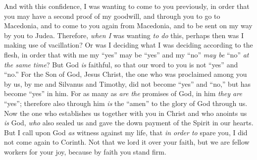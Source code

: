 \begin{biblechapter}
 And with this confidence, I was wanting to come to you previously, in order that you may have a second proof of my goodwill,
\verse and through you to go to Macedonia, and to come to you again from Macedonia, and to be sent on my way by you to Judea.
\verse Therefore, \textit{when I} was wanting \textit{to do} this, perhaps then was I making use of vacillation? Or was I deciding what I was deciding according to the flesh, in order that with me my “yes” may be “yes” and my “no” \textit{may be} “no” \textit{at the same time}?
\verse But God \textit{is} faithful, so that our word to you is not “yes” and “no.”
\verse For the Son of God, Jesus Christ, the one who was proclaimed among you by us, by me and Silvanus and Timothy, did not become “yes” and “no,” but has become “yes” in him.
\verse For as many as \textit{are the} promises of God, in him \textit{they are} “yes”; therefore also through him \textit{is} the “amen” to the glory of God through us.
\verse Now the one who establishes us together with you in Christ and who anoints us \textit{is} God,
\verse \textit{who} also sealed us and gave the down payment of the Spirit in our hearts.
\verse But I call upon God \textit{as} witness against my life, that \textit{in order to} spare you, I did not come again to Corinth.
\verse Not that we lord it over your faith, but we are fellow workers for your joy, because by faith you stand firm.
\end{biblechapter}

